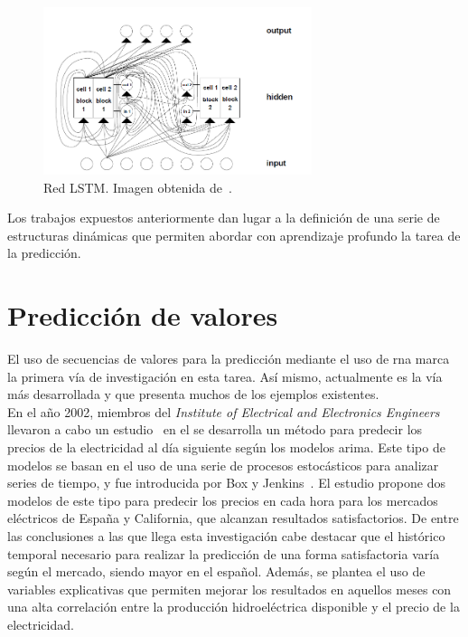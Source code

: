 \begin{figure}[H]
	\begin{center}
		\includegraphics[width=0.7\textwidth]{ figures/estadoarte/lstm_net.PNG}
		\caption{Red LSTM. Imagen obtenida de~\cite{hochreiter1997long}.
		}
		\label{fig.lstm_net}
	\end{center}
\end{figure}
\vspace{-10pt}

Los trabajos expuestos anteriormente dan lugar a la definición de una serie de estructuras dinámicas que permiten abordar con aprendizaje profundo la tarea de la predicción.

\section{Predicción de valores}
El uso de secuencias de valores para la predicción mediante el uso de \acrshort{rna} marca la primera vía de investigación en esta tarea. Así mismo, actualmente es la vía más desarrollada y que presenta muchos de los ejemplos existentes.\\

En el año 2002, miembros del \textit{Institute of Electrical and Electronics Engineers} llevaron a cabo un estudio~\cite{arimaprices} en el se desarrolla un método para predecir los precios de la electricidad al día siguiente según los modelos \acrfull{arima}. Este tipo de modelos se basan en el uso de una serie de procesos estocásticos para analizar series de tiempo, y fue introducida por Box y Jenkins~\cite{box1994series}. El estudio propone dos modelos de este tipo para predecir los precios en cada hora para los mercados eléctricos de España y California, que alcanzan resultados satisfactorios. De entre las conclusiones a las que llega esta investigación cabe destacar que el histórico temporal necesario para realizar la predicción de una forma satisfactoria varía según el mercado, siendo mayor en el español. Además, se plantea el uso de variables explicativas que permiten mejorar los resultados en aquellos meses con una alta correlación entre la producción hidroeléctrica disponible y el precio de la electricidad.\\

